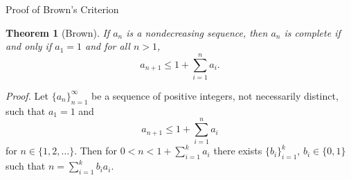 \documentclass{beamer}
\newtheorem*{thm}{Theorem}
\begin{document}
%    
%    

\begin{frame}{Proof of Brown's Criterion}
    \begin{thm}[Brown]
	If $a_n$ is a nondecreasing sequence, then $a_n$ is complete if and only if $a_1 = 1$ and for all $n > 1$,
	\begin{equation}
	a_{n+1} \leq 1+ \sum_{i = 1}^{n} a_i. \nonumber
	\end{equation}
\end{thm}


	\textit{Proof.} Let $\{a_n\}_{n = 1}^{\infty}$ be a sequence of positive integers, not necessarily distinct, such that $a_1 = 1$ and 
	\begin{equation}
	    a_{n + 1} \leq 1 + \sum_{i = 1}^{n}{a_i} \nonumber
	\end{equation}
	for $n \in \{ 1, 2, \ldots\}$. Then for $0<n<1+ \sum_{i = 1}^{k}{a_i}$ there exists $\{b_i\}_{i = 1}^{k}$, $b_i \in \{0, 1\}$ such that $n = \sum_{i = 1}^{k}{b_i a_i}$. 
\end{frame}
\end{document}

